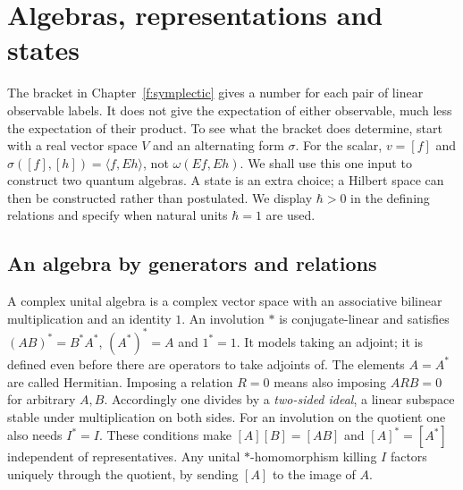 \chapter{Algebras, representations and states}\label{f:quantum}
The bracket in Chapter~\ref{f:symplectic} gives a number for each pair of linear observable labels. It does not give the expectation of either observable, much less the expectation of their product. To see what the bracket does determine, start with a real vector space $V$ and an alternating form $\sigma$. For the scalar, $v=[f]$ and $\sigma([f],[h])=\langle f,Eh\rangle$, not $\omega(Ef,Eh)$. We shall use this one input to construct two quantum algebras. A state is an extra choice; a Hilbert space can then be constructed rather than postulated. We display $\hbar>0$ in the defining relations and specify when natural units $\hbar=1$ are used.

\section{An algebra by generators and relations}
A complex unital algebra is a complex vector space with an associative bilinear multiplication and an identity $1$. An involution $*$ is conjugate-linear and satisfies $(AB)^*=B^*A^*$, $(A^*)^*=A$ and $1^*=1$. It models taking an adjoint; it is defined even before there are operators to take adjoints of. The elements $A=A^*$ are called Hermitian. Imposing a relation $R=0$ means also imposing $ARB=0$ for arbitrary $A,B$. Accordingly one divides by a \emph{two-sided ideal}, a linear subspace stable under multiplication on both sides. For an involution on the quotient one also needs $I^*=I$. These conditions make $[A][B]=[AB]$ and $[A]^*=[A^*]$ independent of representatives. Any unital $*$-homomorphism killing $I$ factors uniquely through the quotient, by sending $[A]$ to the image of $A$.

